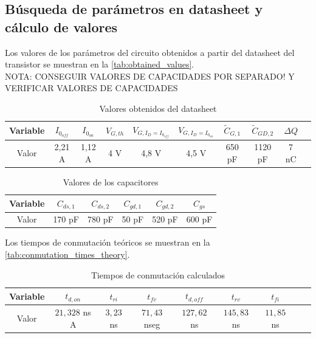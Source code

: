 \documentclass[e4_tp1_main.tex]{subfiles}
\begin{document}
\subsection{Búsqueda de parámetros en datasheet y cálculo de valores}

Los valores de los parámetros del circuito obtenidos a partir del datasheet del transistor se muestran en la \autoref{tab:obtained_values}.\\
NOTA: CONSEGUIR VALORES DE CAPACIDADES POR SEPARADO! Y VERIFICAR VALORES DE CAPACIDADES
\begin{table}[H]
\centering
\begin{tabular}{|c|c|c|c|c|c|c|c|c|c|}
\hline
Variable & $I_{0_{off}}$ & $I_{0_{on}}$ & $V_{G,th}$ & $V_{G,I_D=I_{0_{off}}}$   & $V_{G,I_D=I_{0_{on}}}$ & $\tilde{C}_{G,1}$ & $\tilde{C}_{GD,2}$ & $\Delta Q$  \\
\hline
Valor & 2,21 A & 1,12 A & 4 V & 4,8 V & 4,5 V & 650 pF & 1120 pF & 7 nC\\
\hline
\end{tabular}
\caption{Valores obtenidos del datasheet}
\label{tab:obtained_values}
\end{table}

\begin{table}[H]
\centering
\begin{tabular}{|c|c|c|c|c|c|}
\hline
Variable & $C_{ds,1}$ & $C_{ds,2}$ & $C_{gd,1}$ & $C_{gd,2}$ & $C_{gs}$\\
\hline
Valor & 170 pF & 780 pF & 50 pF & 520 pF & 600 pF\\
\hline
\end{tabular}
\caption{Valores de los capacitores}
\label{tab:obtained_values}
\end{table}

Los tiempos de conmutación teóricos se muestran en la \autoref{tab:conmutation_times_theory}.

\begin{table}[H]
\centering
\begin{tabular}{|c|c|c|c|c|c|c|c|c|}
\hline
Variable & $t_{d,on}$ & $t_{ri}$ & $t_{fv}$ & $t_{d,off}$ & $t_{rv}$ & $t_{fi}$  \\
\hline
Valor & $21,328$ ns A & $3,23$ ns & $71,43$ nseg & $127,62$ ns & $145,83$ ns & $11,85$ ns\\
\hline
\end{tabular}	
\caption{Tiempos de conmutación calculados}
\label{tab:conmutation_times_theory}
\end{table}
\end{document}
